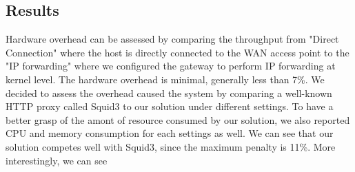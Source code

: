 \subsection{Results}

Hardware overhead can be assessed by comparing the throughput from "Direct Connection" where the host is directly connected to the WAN access point to the "IP forwarding" where we configured the gateway to perform IP forwarding at kernel level. The hardware overhead is minimal, generally less than 7\%.
We decided to assess the overhead caused the system by comparing a well-known HTTP proxy called Squid3 to our solution under different settings. To have a better grasp of the amont of resource consumed by our solution, we also reported CPU and memory consumption for each settings as well.
We can see that our solution competes well with Squid3, since the maximum penalty is 11\%. More interestingly, we can see 








